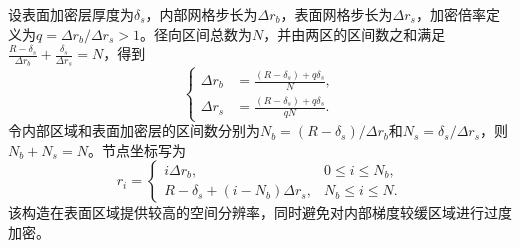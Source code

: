 \documentclass[withoutpreface,bwprint]{cumcmthesis}
\begin{document}
设表面加密层厚度为$\delta_s$，内部网格步长为$\Delta r_b$，表面网格步长为$\Delta r_s$，加密倍率定义为$q=\Delta r_b/\Delta r_s>1$。径向区间总数为$N$，并由两区的区间数之和满足$\frac{R-\delta_s}{\Delta r_b}+\frac{\delta_s}{\Delta r_s}=N$，得到
\begin{equation}
\left\{
\begin{aligned}
\Delta r_b
&=\frac{(R-\delta_s)+q\delta_s}{N},\\
\Delta r_s
&=\frac{(R-\delta_s)+q\delta_s}{qN}.
\end{aligned}
\right.
\label{eq:q2-grid-steps}
\end{equation}
令内部区域和表面加密层的区间数分别为$N_b=(R-\delta_s)/\Delta r_b$和$N_s=\delta_s/\Delta r_s$，则$N_b+N_s=N$。节点坐标写为
\begin{equation}
r_i=
\begin{cases}
i\Delta r_b,
&0\le i\le N_b,\\
R-\delta_s+(i-N_b)\Delta r_s,
&N_b\le i\le N.
\end{cases}
\label{eq:q2-grid-nodes}
\end{equation}
该构造在表面区域提供较高的空间分辨率，同时避免对内部梯度较缓区域进行过度加密。
\end{document}
